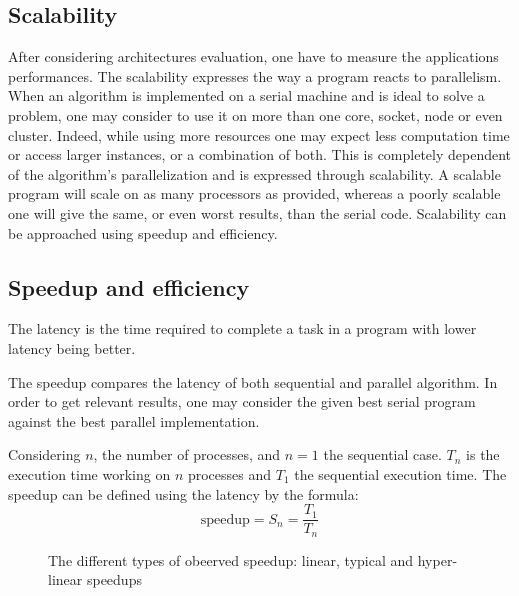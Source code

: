 \subsection{Scalability}

After considering architectures evaluation, one have to measure the applications performances.
The scalability expresses the way a program reacts to parallelism. 
When an algorithm is implemented on a serial machine and is ideal to solve a problem, one may consider to use it on more than one core, socket, node or even cluster. 
Indeed, while using more resources one may expect less computation time or access larger instances, or a combination of both. 
This is completely dependent of the algorithm's parallelization and is expressed through scalability. 
A scalable program will scale on as many processors as provided, whereas a poorly scalable one will give the same, or even worst results, than the serial code.  
Scalability can be approached using speedup and efficiency.

\subsection{Speedup and efficiency}
The latency is the time required to complete a task in a program with lower latency being better. 

The speedup compares the latency of both sequential and parallel algorithm. 
In order to get relevant results, one may consider the given best serial program against the best parallel implementation.

Considering $n$, the number of processes, and $n=1$ the sequential case.
$T_n$ is the execution time working on $n$ processes and $T_1$ the sequential execution time. 
The speedup can be defined using the latency by the formula: 
\begin{equation}
\text{speedup} = S_n =  \frac{T_1}{T_n}
\end{equation}

\begin{figure}
\centering 
{}
\caption{The different types of obeerved speedup: linear, typical and hyper-linear speedups}
\label{fig:1_HPC:speedup_obs}
\end{figure}


